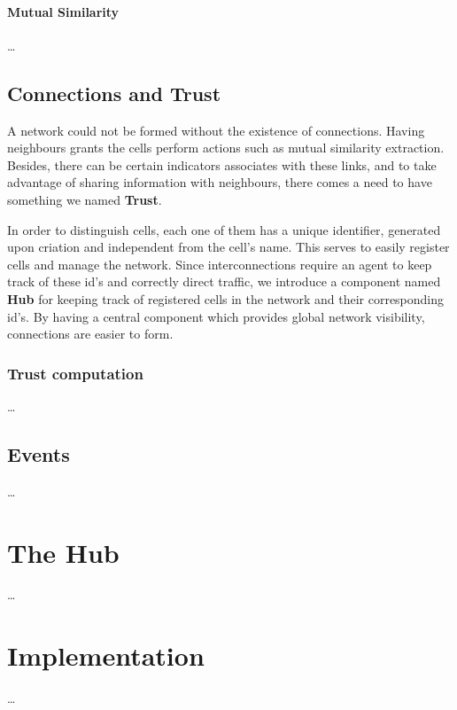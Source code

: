 \paragraph{Mutual Similarity}
\dots

\subsection{Connections and Trust}

A network could not be formed without the existence of connections. Having neighbours grants the cells perform actions such as mutual similarity extraction. Besides, there can be certain indicators associates with these links, and to take advantage of sharing information with neighbours, there comes a need to have something we named \textbf{Trust}.

In order to distinguish cells, each one of them has a unique identifier, generated upon criation and independent from the cell's name. This serves to easily register cells and manage the network. Since interconnections require an agent to keep track of these id's and correctly direct traffic, we introduce a component named \textbf{Hub} for keeping track of registered cells in the network and their corresponding id's. By having a central component which provides global network visibility, connections are easier to form.


\subsubsection{Trust computation}
\dots


\subsection{Events}

\dots


\section{The Hub}

\dots


\section{Implementation}

\dots
